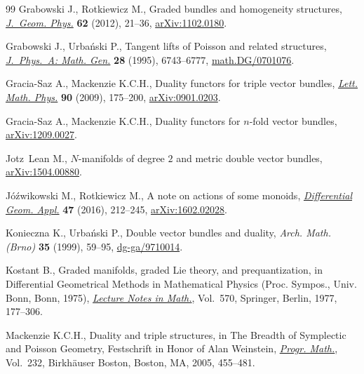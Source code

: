 \documentclass[pdftex]{sigma}
\numberwithin{equation}{section}
\begin{document}
\begin{thebibliography}{99}
Grabowski J., Rotkiewicz M., Graded bundles and homogeneity structures,
  \href{http://dx.doi.org/10.1016/j.geomphys.2011.09.004}{\textit{J.~Geom. Phys.}} \textbf{62} (2012), 21--36, \href{http://arxiv.org/abs/1102.0180}{arXiv:1102.0180}.

Grabowski J., Urba{\'n}ski P., Tangent lifts of {P}oisson and related
  structures, \href{http://dx.doi.org/10.1088/0305-4470/28/23/024}{\textit{J.~Phys.~A: Math. Gen.}} \textbf{28} (1995), 6743--6777,
  \href{http://arxiv.org/abs/math.DG/0701076}{math.DG/0701076}.

Gracia-Saz A., Mackenzie K.C.H., Duality functors for triple vector bundles,
  \href{http://dx.doi.org/10.1007/s11005-009-0346-z}{\textit{Lett. Math. Phys.}} \textbf{90} (2009), 175--200, \href{http://arxiv.org/abs/0901.0203}{arXiv:0901.0203}.

Gracia-Saz A., Mackenzie K.C.H., Duality functors for $n$-fold vector bundles,
  \href{http://arxiv.org/abs/1209.0027}{arXiv:1209.0027}.

Jotz~Lean M., $N$-manifolds of degree $2$ and metric double vector bundles,
  \href{http://arxiv.org/abs/1504.00880}{arXiv:1504.00880}.

J{\'o}{\'z}wikowski M., Rotkiewicz M., A note on actions of some monoids,
  \href{http://dx.doi.org/10.1016/j.difgeo.2016.04.003}{\textit{Differential Geom. Appl.}} \textbf{47} (2016), 212--245,
  \href{http://arxiv.org/abs/1602.02028}{arXiv:1602.02028}.

Konieczna K., Urba{\'n}ski P., Double vector bundles and duality, \textit{Arch.
  Math. (Brno)} \textbf{35} (1999), 59--95, \href{http://arxiv.org/abs/dg-ga/9710014}{dg-ga/9710014}.

Kostant B., Graded manifolds, graded {L}ie theory, and prequantization, in
  Dif\/ferential Geometrical Methods in Mathematical Physics ({P}roc. {S}ympos.,
  {U}niv. {B}onn, {B}onn, 1975), \href{http://dx.doi.org/10.1007/BFb0087788}{\textit{Lecture Notes in Math.}}, Vol.~570,
  Springer, Berlin, 1977, 177--306.

Mackenzie K.C.H., Duality and triple structures, in The Breadth of Symplectic
  and {P}oisson Geometry, Festschrift in Honor of Alan Weinstein,
  \href{http://dx.doi.org/10.1007/0-8176-4419-9_15}{\textit{Progr. Math.}}, Vol.~232, Birkh\"auser Boston, Boston, MA, 2005,
  455--481.


\end{thebibliography}
\end{document}
